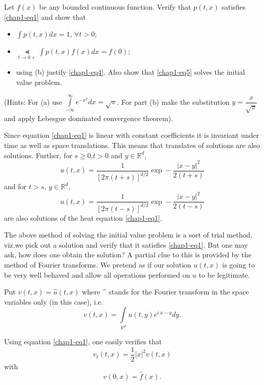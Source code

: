 \begin{exercise}\label{chap1-exer1}
Let $f(x)$ be any bounded continuous function. Verify that $p(t,x)$
satisfies \eqref{chap1-eq1} and show that
\begin{itemize}
\item[(a)] $\int p(t,x)dx=1$, $\forall t>0$;

\item[(b)] $\Lt\limits_{t\to 0+}\int p(t,x)f(x)dx=f(0)$;

\item[(c)] using (b) justify \eqref{chap1-eq4}. Also show that
  \eqref{chap1-eq5} solves the initial value problem.
\end{itemize}
(Hints: For (a) use
$\int\limits^{\infty}_{-\infty}e^{-x^{2}}dx=\sqrt{\pi}$. For part (b)
make the substitution $y=\dfrac{x}{\sqrt{\pi}}$ and apply Lebesgue
dominated convergence theorem). 
\end{exercise}

Since equation \eqref{chap1-eq1} is linear with constant coefficients
it is invariant under time as well as space translations. This means
that translates of solutions are also solutions. Further, for $s\geq
0$,\pageoriginale $t>0$ and $y\in \mathbb{R}^{d}$,
\begin{equation*}
u(t,x)=\frac{1}{[2\pi(t+s)]^{d/2}}\exp-\frac{|x-y|^{2}}{2(t+s)}\tag{6}\label{chap1-eq6}
\end{equation*}
and for $t>s$, $y\in \mathbb{R}^{d}$,
\begin{equation*}
u(t,x)=\frac{1}{[2\pi(t-s)]^{d/2}}\exp-\frac{|x-y|^{2}}{2(t-s)}\tag{7}\label{chap1-eq7}
\end{equation*}
are also solutions of the heat equation \eqref{chap1-eq1}.

The above method of solving the initial value problem is a sort of
trial method, viz.\@ we pick out a solution and verify that it
satisfies \eqref{chap1-eq1}. But one may ask, how does one obtain the
solution? A partial clue to this is provided by the method of Fourier
transforms. We pretend as if our solution $u(t,x)$ is going to be very
well behaved and allow all operations performed on $u$ to be
legitimate.

Put $v(t,x)=\hat{u}(t,x)$ where $\sphat$ stands for the Fourier
transform in the space variables only (in this case), i.e.
$$
v(t,x)=\int\limits_{\mathbb{R}^{d}}u(t,y)e^{i\ x-y}dy.
$$

Using equation \eqref{chap1-eq1}, one easily verifies that
\begin{equation*}
v_{t}(t,x)=\frac{1}{2}|x|^{2}v(t,x)\tag{8}\label{chap1-eq8}
\end{equation*}
with 
\begin{equation*}
v(0,x)=\hat{f}(x).\tag{9}\label{chap1-eq9}
\end{equation*}

